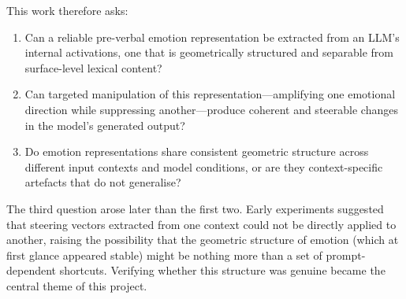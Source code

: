 This work therefore asks:
\begin{enumerate}
    \item Can a reliable pre-verbal emotion representation be extracted from an LLM's internal activations, one that is geometrically structured and separable from surface-level lexical content?
    \item Can targeted manipulation of this representation---amplifying one emotional direction while suppressing another---produce coherent and steerable changes in the model's generated output?
    \item Do emotion representations share consistent geometric structure across different input contexts and model conditions, or are they context-specific artefacts that do not generalise?
\end{enumerate}

The third question arose later than the first two. Early experiments suggested that steering vectors extracted from one context could not be directly applied to another, raising the possibility that the geometric structure of emotion (which at first glance appeared stable) might be nothing more than a set of prompt-dependent shortcuts. Verifying whether this structure was genuine became the central theme of this project.